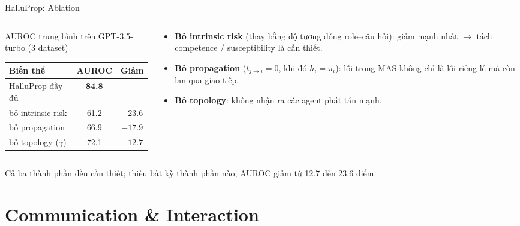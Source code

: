\documentclass[aspectratio=169,10pt]{beamer}
\begin{document}
\begin{frame}{HalluProp: Ablation}
  \begin{columns}[T]
    \begin{column}{0.5\textwidth}
      \centering
      {\small AUROC trung bình trên GPT-3.5-turbo (3 dataset)\par}
      \vspace{4pt}
      \begin{tabular}{@{}l c c@{}}
        \toprule
        Biến thể & AUROC & Giảm \\
        \midrule
        HalluProp đầy đủ        & \textbf{84.8} & -- \\
        bỏ intrinsic risk       & 61.2 & \alert{$-23.6$} \\
        bỏ propagation          & 66.9 & \alert{$-17.9$} \\
        bỏ topology ($\gamma$)  & 72.1 & \alert{$-12.7$} \\
        \bottomrule
      \end{tabular}
    \end{column}
    \begin{column}{0.46\textwidth}
      \begin{itemize}
        \item \textbf{Bỏ intrinsic risk} (thay bằng độ tương đồng role--câu hỏi): giảm mạnh nhất
          $\to$ tách competence / susceptibility là cần thiết.
        \item \textbf{Bỏ propagation} ($t_{j\to i} = 0$, khi đó $h_i = \pi_i$): lỗi trong MAS
          không chỉ là lỗi riêng lẻ mà còn lan qua giao tiếp.
        \item \textbf{Bỏ topology}: không nhận ra các agent phát tán mạnh.
      \end{itemize}
    \end{column}
  \end{columns}
  \vspace{6pt}
  \begin{block}{}
    Cả ba thành phần đều cần thiết; thiếu bất kỳ thành phần nào, AUROC giảm từ 12.7 đến 23.6 điểm.
  \end{block}
\end{frame}

\section{Communication \& Interaction}
\end{document}
